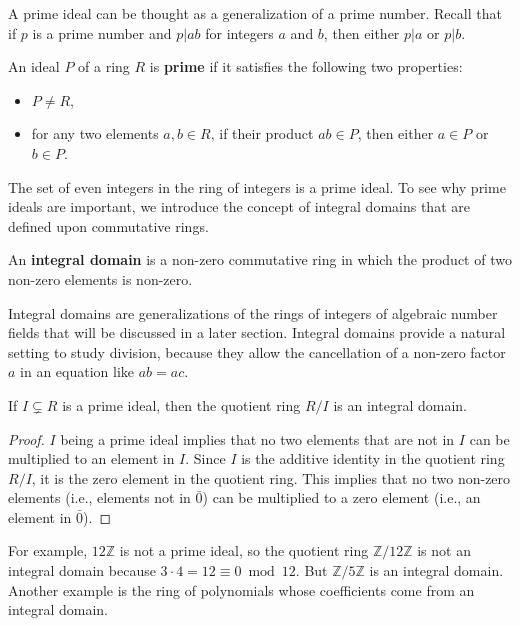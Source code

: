 \documentclass[../main.tex]{subfiles}
\begin{document}
A prime ideal can be thought as a generalization of a prime number. Recall that if $p$ is a prime number and $p | ab$ for integers $a$ and $b$, then either $p | a$ or $p | b$. 
\begin{definition}
An ideal $P$ of a ring $R$ is \textbf{prime}\reversemarginpar{}
 if it satisfies the following two properties:
\begin{itemize}
    \item $P \neq R$, 
    \item for any two elements $a,b \in R$, if their product $ab \in P$, then either $a \in P$ or $b \in P$.
\end{itemize}
\end{definition}
The set of even integers in the ring of integers is a prime ideal.
To see why prime ideals are important, we introduce the concept of integral domains that are defined upon commutative rings.  

\begin{definition}
An \textbf{integral domain}\reversemarginpar
{}
 is a non-zero commutative ring in which the product of two non-zero elements is non-zero. 
\end{definition}
Integral domains are generalizations of the rings of integers of algebraic number fields that will be discussed in a later section. Integral domains provide a natural setting to study division, because they allow the cancellation of a non-zero factor $a$ in an equation like $ab=ac$. 


\begin{proposition}
If $I \subsetneq R$ is a prime ideal, then the quotient ring $R/I$ is an integral domain.
\end{proposition}
\begin{proof}
$I$ being a prime ideal implies that no two elements that are not in $I$ can be multiplied to an element in $I$. Since $I$ is the additive identity in the quotient ring $R/I$, it is the zero element in the quotient ring. This implies that no two non-zero elements (i.e., elements not in $\bar{0}$) can be multiplied to a zero element (i.e., an element in $\bar{0}$). 
\end{proof}
For example, $12\mathbb{Z}$ is not a prime ideal, so the quotient ring $\mathbb{Z}/12\mathbb{Z}$ is not an integral domain because $3 \cdot 4 = 12 \equiv 0 \bmod 12$. But $\mathbb{Z}/5\mathbb{Z}$ is an integral domain. 
Another example is the ring of polynomials whose coefficients come from an integral domain. 
\end{document}
